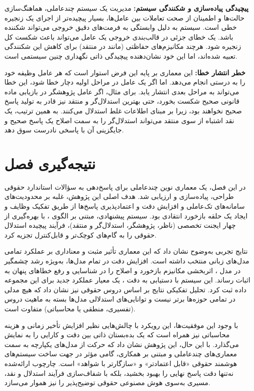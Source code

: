 \documentclass[12pt,a4paper]{report}
\begin{document}
	\textbf{پیچیدگی پیاده‌سازی و شکنندگی سیستم:} مدیریت یک سیستم چندعاملی، هماهنگ‌سازی حالت‌ها و اطمینان از صحت تعاملات بین عامل‌ها، بسیار پیچیده‌تر از اجرای یک زنجیره خطی است. سیستم به دلیل وابستگی به فرمت‌های دقیق خروجی می‌تواند شکننده باشد. یک خطای جزئی در قالب‌بندی خروجی یک عامل می‌تواند باعث شکست کل زنجیره شود. هرچند مکانیزم‌های حفاظتی (مانند  در منتقد) برای کاهش این شکنندگی تعبیه شده‌اند، اما این خود نشان‌دهنده پیچیدگی ذاتی نگهداری چنین سیستمی است.
	
	\textbf{خطر انتشار خطا:} این معماری بر پایه این فرض استوار است که هر عامل وظیفه خود را به درستی انجام می‌دهد. اما اگر یک عامل در مراحل اولیه دچار خطا شود، این خطا می‌تواند به مراحل بعدی انتشار یابد. برای مثال، اگر عامل پژوهشگر در بازیابی ماده قانونی صحیح شکست بخورد، حتی بهترین استدلال‌گر و منتقد نیز قادر به تولید پاسخ صحیح نخواهند بود، زیرا بر مبنای اطلاعات غلط استدلال می‌کنند. به همین ترتیب، یک نقد اشتباه از سوی منتقد می‌تواند استدلال‌گر را به سمت اصلاح یک پاسخ صحیح و جایگزینی آن با پاسخی نادرست سوق دهد.
	
	\section{نتیجه‌گیری فصل}
	
	در این فصل، یک معماری نوین چندعاملی برای پاسخ‌دهی به سؤالات استاندارد حقوقی طراحی، پیاده‌سازی و ارزیابی شد. هدف اصلی این پژوهش، غلبه بر محدودیت‌های سامانه‌های تک‌عاملی و افزایش دقت و اعتمادپذیری پاسخ‌ها از طریق تفکیک وظایف و ایجاد یک حلقه بازخورد انتقادی بود. سیستم پیشنهادی، مبتنی بر الگوی ، با بهره‌گیری از چهار ایجنت تخصصی (ناظر، پژوهشگر، استدلال‌گر و منتقد)، فرآیند پیچیده استدلال حقوقی را به گام‌های کوچک‌تر و قابل‌کنترل تجزیه کرد.
	
	نتایج تجربی به‌وضوح نشان داد که این معماری تأثیر مثبت و معناداری بر عملکرد تمامی مدل‌های زبانی منتخب داشته است. افزایش دقت در تمام مدل‌ها، به‌ویژه رشد چشمگیر  در مدل ، اثربخشی مکانیزم بازخورد و اصلاح  را در شناسایی و رفع خطاهای پنهان به اثبات رساند. این سیستم با دستیابی به دقت ، یک معیار عملکرد جدید برای این مجموعه داده ثبت کرد. تحلیل تفکیکی نتایج بر اساس دروس حقوقی نیز نشان داد که هیچ مدلی در تمامی حوزه‌ها برتر نیست و توانایی‌های استدلالی مدل‌ها بسته به ماهیت دروس (تفسیری، منطقی یا محاسباتی) متفاوت است.
	
	با وجود این موفقیت‌ها، این رویکرد با چالش‌هایی نظیر افزایش تأخیر زمانی و هزینه محاسباتی نیز همراه است که یک بده‌بستان ذاتی بین دقت و کارایی را به نمایش می‌گذارد. با این حال، این پژوهش نشان داد که حرکت از مدل‌های یکپارچه  به سمت معماری‌های چندعاملی و مبتنی بر همکاری، گامی مؤثر در جهت ساخت سیستم‌های هوشمند حقوقی «قابل اعتمادتر» و «سازگارتر با شواهد» است. چارچوب ارائه‌شده نه‌تنها دقت پاسخ نهایی را بهبود بخشید، بلکه با شفاف‌سازی فرآیند استدلال و نقد، مسیری به‌سوی هوش مصنوعی حقوقی توضیح‌پذیر  را نیز هموار می‌سازد.
	
\end{document}
